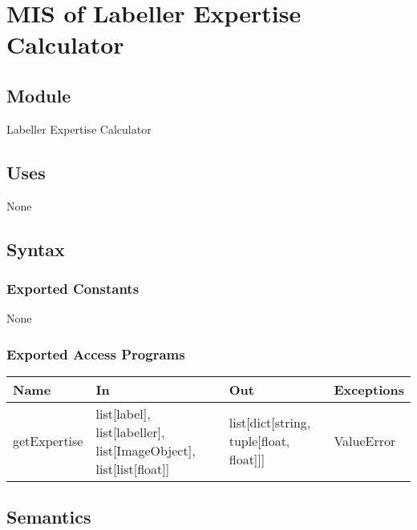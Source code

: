 \documentclass[12pt, titlepage]{article}
\begin{document}
\section{MIS of Labeller Expertise Calculator }\label{labeller expertise calculator}
  
  
  
  \subsection{Module}
  
  Labeller Expertise Calculator
  
  \subsection{Uses}
  
  None

  \subsection{Syntax}


  
  \subsubsection{Exported Constants}
  None
  \subsubsection{Exported Access Programs}
  
  \begin{center}
  \begin{tabular}{p{2cm} p{4cm} p{4cm} p{2cm}}
  \hline
  \textbf{Name} & \textbf{In} & \textbf{Out} & \textbf{Exceptions} \\
  \hline
  getExpertise & list[label], list[labeller], list[ImageObject], list[list[float]] & list[dict[string, tuple[float, float]]]  & ValueError \\
  
  \end{tabular}
  \end{center}
  
  \subsection{Semantics}
  
\end{document}
